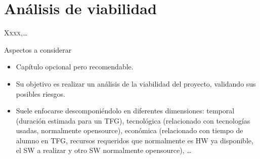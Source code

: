 \chapter{Análisis de viabilidad}
\label{chap:viabilidade}

\lettrine{X}{xxx},\dots

{ \color{red} Aspectos a considerar
    \begin{itemize}
      \item Capítulo opcional pero recomendable.
      \item Su objetivo es realizar un análisis de la viabilidad del proyecto, validando sus posibles riesgos.
      \item Suele enfocarse descomponiéndolo en diferentes dimensiones: temporal (duración estimada para un TFG), tecnológica (relacionado con tecnologías usadas, normalmente opensource), económica (relacionado con tiempo de alumno en TFG, recursos requeridos que normalmente es HW ya disponible, el SW a realizar y otro SW normalmente opensource), \dots 
    \end{itemize}
}
